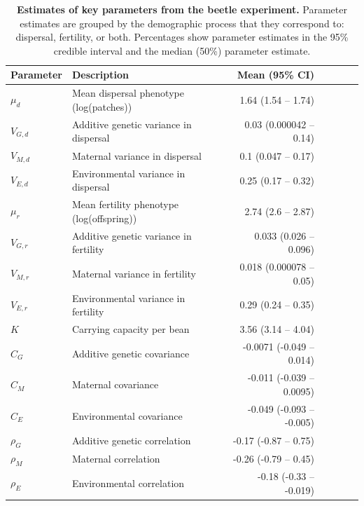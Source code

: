 \documentclass[11pt]{article}
\begin{document}
\newpage{}
\begin{table}[h]
\centering
\label{Estimates of key parameters from the beetle experiment}
\caption[Estimates of key parameters from the beetle experiment]{\textbf{Estimates of key parameters from the beetle experiment.} Parameter estimates are grouped by the demographic process that they correspond to: dispersal, fertility, or both. Percentages show parameter estimates in the 95\% credible interval and the median (50\%) parameter estimate.}\label{corr:estimates}\vspace{0.1in}
\begin{tabularx}{0.95\linewidth}{lXrrrrr}
\toprule
Parameter   & Description                               & Mean (95\% CI) \\ \midrule
$\mu_{d}$   & Mean dispersal phenotype (log(patches)) & 1.64 (1.54 -- 1.74) \\
$V_{G,d}$   & Additive genetic variance in dispersal &  0.03 (0.000042 -- 0.14)  \\
$V_{M,d}$   & Maternal variance in dispersal    &  0.1 (0.047 -- 0.17)  \\ 
$V_{E,d}$   & Environmental variance in dispersal  &  0.25 (0.17 -- 0.32)  \\ \midrule
$\mu_{r}$   & Mean fertility phenotype (log(offspring)) &  2.74 (2.6 -- 2.87)  \\
$V_{G,r}$   & Additive genetic variance in fertility &  0.033 (0.026 -- 0.096)  \\
$V_{M,r}$   & Maternal variance in fertility &  0.018 (0.000078 -- 0.05)  \\
$V_{E,r}$   & Environmental variance in fertility    &  0.29 (0.24 -- 0.35) \\
$K$         & Carrying capacity per bean   &  3.56 (3.14 -- 4.04)  \\ \midrule
$C_{G}$     & Additive genetic covariance &  -0.0071 (-0.049 -- 0.014) \\
$C_{M}$     & Maternal covariance & -0.011 (-0.039 -- 0.0095) \\
$C_{E}$     & Environmental covariance   & -0.049 (-0.093 -- -0.005)  \\
$\rho_{G}$  & Additive genetic correlation  &  -0.17 (-0.87 -- 0.75)\\
$\rho_{M}$  & Maternal correlation  &  -0.26 (-0.79 -- 0.45) \\
$\rho_{E}$  & Environmental correlation     &  -0.18 (-0.33 -- -0.019) \\
\bottomrule
\end{tabularx}
\end{table}
\end{document}
